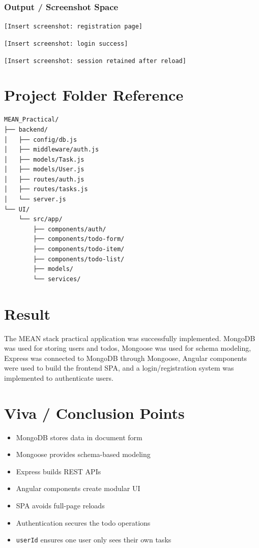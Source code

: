 \documentclass[12pt,a4paper]{article}
\begin{document}
\subsubsection*{Output / Screenshot Space}
\texttt{[Insert screenshot: registration page]}

\texttt{[Insert screenshot: login success]}

\texttt{[Insert screenshot: session retained after reload]}

\section*{Project Folder Reference}
\begin{lstlisting}[style=projectcode]
MEAN_Practical/
├── backend/
│   ├── config/db.js
│   ├── middleware/auth.js
│   ├── models/Task.js
│   ├── models/User.js
│   ├── routes/auth.js
│   ├── routes/tasks.js
│   └── server.js
└── UI/
    └── src/app/
        ├── components/auth/
        ├── components/todo-form/
        ├── components/todo-item/
        ├── components/todo-list/
        ├── models/
        └── services/
\end{lstlisting}

\section*{Result}
The MEAN stack practical application was successfully implemented. MongoDB was used for storing users and todos, Mongoose was used for schema modeling, Express was connected to MongoDB through Mongoose, Angular components were used to build the frontend SPA, and a login/registration system was implemented to authenticate users.

\section*{Viva / Conclusion Points}
\begin{itemize}
  \item MongoDB stores data in document form
  \item Mongoose provides schema-based modeling
  \item Express builds REST APIs
  \item Angular components create modular UI
  \item SPA avoids full-page reloads
  \item Authentication secures the todo operations
  \item \texttt{userId} ensures one user only sees their own tasks
\end{itemize}
\end{document}
